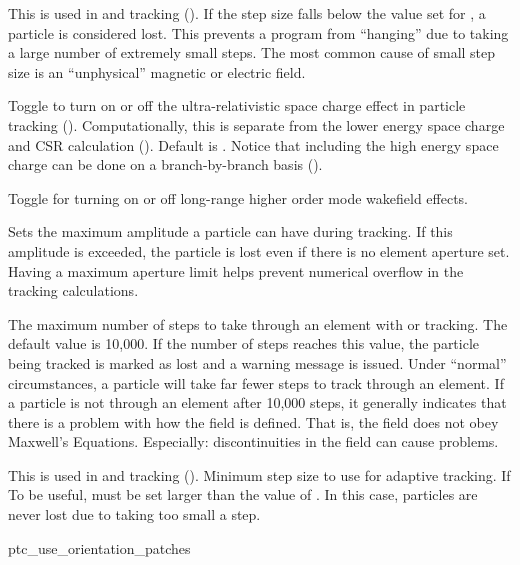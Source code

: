 {\begin{description}
%
\item[] \Newline
This is used in  and  tracking
().  If the step size falls below the value set for
, a particle is considered lost.
This prevents a program from ``hanging'' due to taking a large number
of extremely small steps. The most common cause of small step size is
an ``unphysical'' magnetic or electric field.
%
\item[] \Newline
Toggle to turn on or off the ultra-relativistic space charge effect in particle tracking
(). Computationally, this is separate from the lower energy space charge and
CSR calculation (). Default is . Notice that including the high energy space
charge can be done on a branch-by-branch basis ().
%
\item[] \Newline
Toggle for turning on or off long-range higher order mode wakefield effects.
%
\item[] \Newline 
Sets the maximum amplitude a particle can have during tracking. If this amplitude is exceeded, the
particle is lost even if there is no element aperture set. Having a maximum aperture limit helps
prevent numerical overflow in the tracking calculations.
%
\item[] \Newline 
The maximum number of steps to take through an element with  or
 tracking. The default value is 10,000. If the number of steps reaches this
value, the particle being tracked is marked as lost and a warning message is issued. Under
``normal'' circumstances, a particle will take far fewer steps to track through an element. If a
particle is not through an element after 10,000 steps, it generally indicates that there is a
problem with how the field is defined. That is, the field does not obey Maxwell's
Equations. Especially: discontinuities in the field can cause problems.
%
\item[] \Newline
This is used in  and  tracking (). Minimum step
size to use for adaptive tracking. If To be useful,  must be set
larger than the value of . In this case, particles are never lost
due to taking too small a step.
%
\item{ptc_use_orientation_patches} \Newline

\end{description}}

